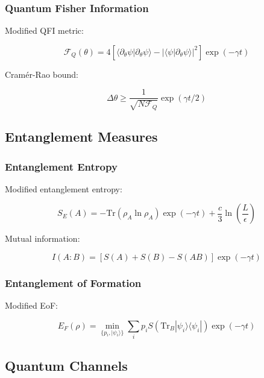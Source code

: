\documentclass[12pt]{article}
\theoremstyle{plain}
\theoremstyle{definition}
\theoremstyle{remark}
\begin{document}
\subsubsection{Quantum Fisher Information}

Modified QFI metric:

\begin{equation}
\mathcal{F}_Q(\theta) = 4[\langle\partial_\theta\psi|\partial_\theta\psi\rangle - |\langle\psi|\partial_\theta\psi\rangle|^2]\exp(-\gamma t)
\end{equation}

Cramér-Rao bound:

\begin{equation}
\Delta\theta \geq \frac{1}{\sqrt{N\mathcal{F}_Q}}\exp(\gamma t/2)
\end{equation}

\subsection{Entanglement Measures}

\subsubsection{Entanglement Entropy}

Modified entanglement entropy:

\begin{equation}
S_E(A) = -\text{Tr}(\rho_A\ln\rho_A)\exp(-\gamma t) + \frac{c}{3}\ln\left(\frac{L}{\epsilon}\right)
\end{equation}

Mutual information:

\begin{equation}
I(A:B) = [S(A) + S(B) - S(AB)]\exp(-\gamma t)
\end{equation}

\subsubsection{Entanglement of Formation}

Modified EoF:

\begin{equation}
E_F(\rho) = \min_{\{p_i,|\psi_i\rangle\}} \sum_i p_iS(\text{Tr}_B|\psi_i\rangle\langle\psi_i|)\exp(-\gamma t)
\end{equation}

\subsection{Quantum Channels}
\end{document}
